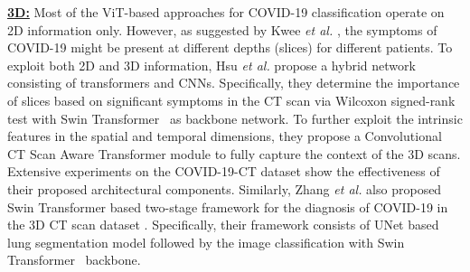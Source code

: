 \documentclass[10pt,journal,compsoc]{IEEEtran}
\begin{document}
 {\underline{\textbf{3D:}}}
Most of the ViT-based approaches for COVID-19 classification operate on 2D information only. However, as suggested by Kwee \textit{et al.} \cite{kwee2020chest}, the symptoms of COVID-19 might be present at different depths (slices) for different patients. To exploit both 2D and 3D information, Hsu \textit{et al.} \cite{hsu2021visual} propose a hybrid network consisting of transformers and CNNs. Specifically, they determine the importance of slices based on significant symptoms in the CT scan via Wilcoxon signed-rank test \cite{woolson2007wilcoxon} with Swin Transformer~\cite{liu2021swin} as backbone network. To further exploit the intrinsic features in the spatial and temporal dimensions, they propose a Convolutional CT Scan Aware Transformer module to fully capture the context of the 3D scans. Extensive experiments on the COVID-19-CT dataset show the effectiveness of their proposed architectural components. %
Similarly, Zhang \textit{et al.} \cite{zhang2021transformer,zhangmia} also proposed Swin Transformer based two-stage framework for the diagnosis of COVID-19 in the 3D CT scan dataset \cite{kollias2021mia}. Specifically, their framework consists of UNet based lung segmentation model followed by the image classification with Swin Transformer~\cite{liu2021swin} backbone. 
\end{document}
